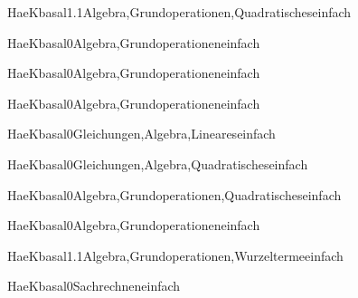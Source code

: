 \documentclass[12pt]{article}
\begin{document}
\begin{Add}{HaeK}{basal1.1}{Algebra,Grundoperationen,Quadratisches}{einfach}
\end{Add}

\begin{Add}{HaeK}{basal0}{Algebra,Grundoperationen}{einfach}
\end{Add}

\begin{Add}{HaeK}{basal0}{Algebra,Grundoperationen}{einfach}
\end{Add}

\begin{Add}{HaeK}{basal0}{Algebra,Grundoperationen}{einfach}
\end{Add}

\begin{Add}{HaeK}{basal0}{Gleichungen,Algebra,Lineares}{einfach}
      
\end{Add}

\begin{Add}{HaeK}{basal0}{Gleichungen,Algebra,Quadratisches}{einfach}
      
\end{Add}

\begin{Add}{HaeK}{basal0}{Algebra,Grundoperationen,Quadratisches}{einfach}
\end{Add}

\begin{Add}{HaeK}{basal0}{Algebra,Grundoperationen}{einfach}
\end{Add}

\begin{Add}{HaeK}{basal1.1}{Algebra,Grundoperationen,Wurzelterme}{einfach}
\end{Add}

\begin{Add}{HaeK}{basal0}{Sachrechnen}{einfach}
\end{Add}
\end{document}
